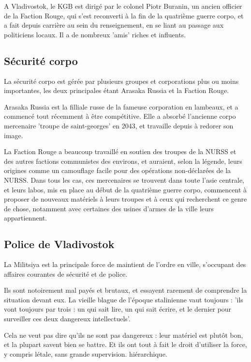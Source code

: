 \documentclass[10pt,a4paper]{book}
\begin{document}
A Vladivostok, le KGB est dirigé par le colonel Piotr Buranin, un ancien officier de la Faction Rouge, qui s'est reconverti à la fin de la quatrième guerre corpo, et a fait depuis carrière au sein du renseignement, en se liant au passage aux politiciens locaux. Il a de nombreux 'amis' riches et influents.
\subsection{Sécurité corpo}
La sécurité corpo est gérée par plusieurs groupes et corporations plus ou moins importantes, les deux principales étant Arasaka Russia et la Faction Rouge.

Arasaka Russia est la filliale russe de la fameuse corporation en lambeaux, et a commencé tout récemment à être compétitive. Elle a absorbé l'ancienne corpo mercenaire 'troupe de saint-georges' en 2043, et travaille depuis à redorer son image.

La Faction Rouge a beaucoup travaillé en soutien des troupes de la NURSS et des autres factions communistes des environs, et auraient, selon la légende, leurs origines comme un camouflage facile pour des opérations non-déclarées de la NURSS. Dans tous les cas, ces mercenaires se trouvent dans toute l'asie centrale, et leurs labos, mis en place au début de la quatrième guerre corpo, commencent à proposer de nouveaux matériels à leurs troupes et à ceux qui recherchent ce genre de chose, notamment avec certaines des usines d'armes de la ville leurs appartiennent.
\subsection{Police de Vladivostok}
La Militsiya est la principale force de maintient de l'ordre en ville, s'occupant des affaires courantes de sécurité et de police.

Ils sont notoirement mal payés et brutaux, et essayent rarement de comprendre la situation devant eux. La vieille blague de l'époque stalinienne vaut toujours : 'ils vont toujours par trois : un qui sait lire, un qui sait écrire, et le dernier pour surveiller ces deux dangereux intellectuels'.

Cela ne veut pas dire qu'ils ne sont pas dangereux : leur matériel est plutôt bon, et la plupart savent bien se battre. Et ils ont tout à fait le droit d'utiliser la force, y compris létale, sans grande supervision.
 hiérarchique.
 
\end{document}
